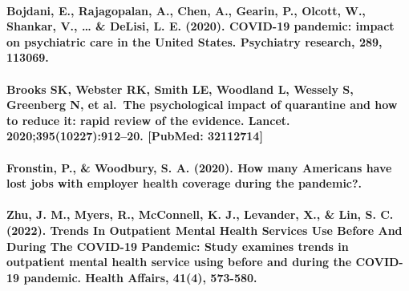 \documentclass[
  12pt,
]{article}
\begin{document}
\hypertarget{bojdani-e.-rajagopalan-a.-chen-a.-gearin-p.-olcott-w.-shankar-v.-delisi-l.-e.-2020.-covid-19-pandemic-impact-on-psychiatric-care-in-the-united-states.-psychiatry-research-289-113069.}{%
\paragraph{Bojdani, E., Rajagopalan, A., Chen, A., Gearin, P., Olcott,
W., Shankar, V., \ldots{} \& DeLisi, L. E. (2020). COVID-19 pandemic:
impact on psychiatric care in the United States. Psychiatry research,
289,
113069.}\label{bojdani-e.-rajagopalan-a.-chen-a.-gearin-p.-olcott-w.-shankar-v.-delisi-l.-e.-2020.-covid-19-pandemic-impact-on-psychiatric-care-in-the-united-states.-psychiatry-research-289-113069.}}

\hypertarget{brooks-sk-webster-rk-smith-le-woodland-l-wessely-s-greenberg-n-et-al.-the-psychological-impact-of-quarantine-and-how-to-reduce-it-rapid-review-of-the-evidence.-lancet.-20203951022791220.-pubmed-32112714}{%
\paragraph{Brooks SK, Webster RK, Smith LE, Woodland L, Wessely S,
Greenberg N, et al.~The psychological impact of quarantine and how to
reduce it: rapid review of the evidence. Lancet.
2020;395(10227):912--20. {[}PubMed:
32112714{]}}\label{brooks-sk-webster-rk-smith-le-woodland-l-wessely-s-greenberg-n-et-al.-the-psychological-impact-of-quarantine-and-how-to-reduce-it-rapid-review-of-the-evidence.-lancet.-20203951022791220.-pubmed-32112714}}

\hypertarget{fronstin-p.-woodbury-s.-a.-2020.-how-many-americans-have-lost-jobs-with-employer-health-coverage-during-the-pandemic.}{%
\paragraph{Fronstin, P., \& Woodbury, S. A. (2020). How many Americans
have lost jobs with employer health coverage during the
pandemic?.}\label{fronstin-p.-woodbury-s.-a.-2020.-how-many-americans-have-lost-jobs-with-employer-health-coverage-during-the-pandemic.}}

\hypertarget{zhu-j.-m.-myers-r.-mcconnell-k.-j.-levander-x.-lin-s.-c.-2022.-trends-in-outpatient-mental-health-services-use-before-and-during-the-covid-19-pandemic-study-examines-trends-in-outpatient-mental-health-service-using-before-and-during-the-covid-19-pandemic.-health-affairs-414-573-580.}{%
\paragraph{Zhu, J. M., Myers, R., McConnell, K. J., Levander, X., \&
Lin, S. C. (2022). Trends In Outpatient Mental Health Services Use
Before And During The COVID-19 Pandemic: Study examines trends in
outpatient mental health service using before and during the COVID-19
pandemic. Health Affairs, 41(4),
573-580.}\label{zhu-j.-m.-myers-r.-mcconnell-k.-j.-levander-x.-lin-s.-c.-2022.-trends-in-outpatient-mental-health-services-use-before-and-during-the-covid-19-pandemic-study-examines-trends-in-outpatient-mental-health-service-using-before-and-during-the-covid-19-pandemic.-health-affairs-414-573-580.}}
\end{document}
